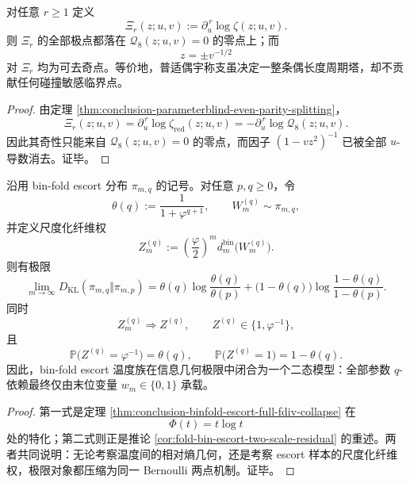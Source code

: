 \begin{corollary}[碰撞响应的谱支撑定理]\label{cor:conclusion-collision-response-spectral-support}
对任意 \(r\ge 1\) 定义
\[
\Xi_r(z;u,v):=\partial_u^{\,r}\log\zeta(z;u,v).
\]
则 \(\Xi_r\) 的全部极点都落在 \(\mathcal Q_8(z;u,v)=0\) 的零点上；而
\[
z=\pm v^{-1/2}
\]
对 \(\Xi_r\) 均为可去奇点。等价地，普适偶宇称支虽决定一整条偶长度周期塔，却不贡献任何碰撞敏感临界点。
\end{corollary}
\begin{proof}
由定理 \ref{thm:conclusion-parameterblind-even-parity-splitting}，
\[
\Xi_r(z;u,v)=\partial_u^{\,r}\log\zeta_{\mathrm{red}}(z;u,v)
=-\partial_u^{\,r}\log\mathcal Q_8(z;u,v).
\]
因此其奇性只能来自 \(\mathcal Q_8(z;u,v)=0\) 的零点，而因子 \((1-vz^2)^{-1}\) 已被全部 \(u\)-导数消去。证毕。
\end{proof}

\begin{theorem}\label{thm:conclusion-escort-two-state-closure}
沿用 bin-fold escort 分布 \(\pi_{m,q}\) 的记号。对任意 \(p,q\ge 0\)，令
\[
\theta(q):=\frac{1}{1+\varphi^{q+1}},
\qquad
W_m^{(q)}\sim \pi_{m,q},
\]
并定义尺度化纤维权
\[
Z_m^{(q)}:=\left(\frac{\varphi}{2}\right)^m d_m^{\mathrm{bin}}\bigl(W_m^{(q)}\bigr).
\]
则有极限
\[
\lim_{m\to\infty}D_{\mathrm{KL}}(\pi_{m,q}\Vert \pi_{m,p})
=
\theta(q)\log\frac{\theta(q)}{\theta(p)}
+
\bigl(1-\theta(q)\bigr)\log\frac{1-\theta(q)}{1-\theta(p)}.
\]
同时
\[
Z_m^{(q)}\Rightarrow Z^{(q)},
\qquad
Z^{(q)}\in\{1,\varphi^{-1}\},
\]
且
\[
\mathbb P\bigl(Z^{(q)}=\varphi^{-1}\bigr)=\theta(q),
\qquad
\mathbb P\bigl(Z^{(q)}=1\bigr)=1-\theta(q).
\]
因此，bin-fold escort 温度族在信息几何极限中闭合为一个二态模型：全部参数 \(q\)-依赖最终仅由末位变量 \(w_m\in\{0,1\}\) 承载。
\end{theorem}
\begin{proof}
第一式是定理 \ref{thm:conclusion-binfold-escort-full-fdiv-collapse} 在
\[
\Phi(t)=t\log t
\]
处的特化；第二式则正是推论 \ref{cor:fold-bin-escort-two-scale-residual} 的重述。两者共同说明：无论考察温度间的相对熵几何，还是考察 escort 样本的尺度化纤维权，极限对象都压缩为同一 Bernoulli 两点机制。证毕。
\end{proof}

